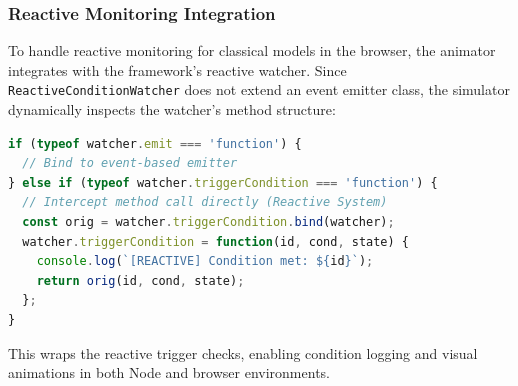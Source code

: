 \subsubsection{Reactive Monitoring Integration}
To handle reactive monitoring for classical models in the browser, the animator integrates with the framework's reactive watcher. Since \texttt{ReactiveConditionWatcher} does not extend an event emitter class, the simulator dynamically inspects the watcher's method structure:
\begin{lstlisting}[language=JavaScript]
if (typeof watcher.emit === 'function') {
  // Bind to event-based emitter
} else if (typeof watcher.triggerCondition === 'function') {
  // Intercept method call directly (Reactive System)
  const orig = watcher.triggerCondition.bind(watcher);
  watcher.triggerCondition = function(id, cond, state) {
    console.log(`[REACTIVE] Condition met: ${id}`);
    return orig(id, cond, state);
  };
}
\end{lstlisting}
This wraps the reactive trigger checks, enabling condition logging and visual animations in both Node and browser environments.
